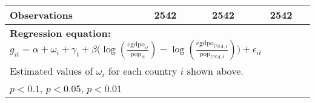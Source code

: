 \begin{sidewaystable}[htbp]
\begin{tabular}{l*{3}{c}}
\midrule
Observations    &     2542         &     2542         &     2542         \\
\bottomrule
\multicolumn{4}{l}{\footnotesize \textbf{Regression equation:} \(g_{it} = \alpha  + \omega_i + \gamma_t + \beta \big(\log (\frac{\textrm{cgdpo}_{it}}{\textrm{pop}_{it}} ) - \log (\frac{\textrm{cgdpo}_{USA,t}}{\textrm{pop}_{USA,t}}  ) \big) + \epsilon_{it}\)}\\
\multicolumn{4}{l}{\footnotesize Estimated values of \(\omega_i\) for each country \(i\) shown above.}\\
\multicolumn{4}{l}{\footnotesize \sym{*} \(p<0.1\), \sym{**} \(p<0.05\), \sym{***} \(p<0.01\)}\\
\end{tabular}
\end{sidewaystable}
